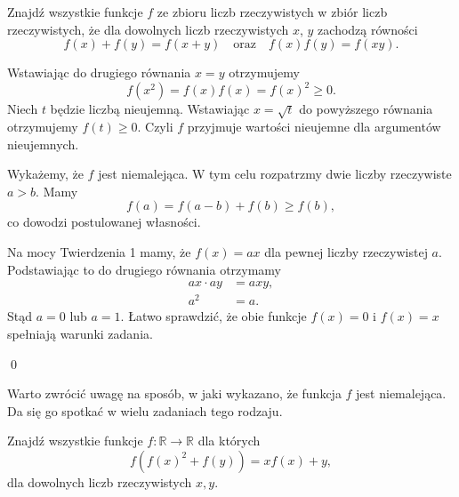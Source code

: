\vspace{10px}


\noindent
Znajdź wszystkie funkcje $f$ ze zbioru liczb rzeczywistych w zbiór liczb rzeczywistych, że dla dowolnych liczb rzeczywistych $x$, $y$ zachodzą równości
\[ 
	f(x) + f(y) = f(x + y) \quad \text{oraz} \quad f(x)f(y) = f(xy).
\]

\vspace{5px}


\noindent
Wstawiając do drugiego równania $x = y$ otrzymujemy
\[
	f(x^2) = f(x)f(x) = f(x)^2 \geqslant 0.
\]
Niech $t$ będzie liczbą nieujemną. Wstawiając $x = \sqrt{t}$ do powyższego równania otrzymujemy $f(t) \geqslant 0$. Czyli $f$ przyjmuje wartości nieujemne dla argumentów nieujemnych.

\vspace{10px}
\noindent
Wykażemy, że $f$ jest niemalejąca. W tym celu rozpatrzmy dwie liczby rzeczywiste $a > b$. Mamy
\[
	f(a) = f(a - b) + f(b) \geqslant f(b),
\]
co dowodzi postulowanej własności.

\vspace{10px}
\noindent
Na mocy Twierdzenia 1 mamy, że $f(x) = ax$ dla pewnej liczby rzeczywistej $a$. Podstawiając to do drugiego równania otrzymamy
\begin{align*}
	ax \cdot ay &= axy, \\
	a^2 &= a.
\end{align*}
Stąd $a = 0$ lub $a = 1$. Łatwo sprawdzić, że obie funkcje $f(x) = 0$ i $f(x) = x$ spełniają warunki zadania.

\qed

\vspace{10px}
\noindent 
Warto zwrócić uwagę na sposób, w jaki wykazano, że funkcja $f$ jest niemalejąca. Da się go spotkać w wielu zadaniach tego rodzaju. 

\vspace{10px}


\noindent
Znajdź wszystkie funkcje $ f:\mathbb{R}\to\mathbb{R} $ dla których 
\[
	f(f(x)^2 + f(y)) = xf(x) + y,
\]
dla dowolnych liczb rzeczywistych $x, y$.


